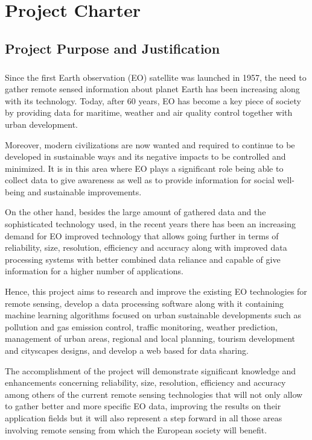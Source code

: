 \chapter{Project Charter}

\section{Project Purpose and Justification}

\paragraph{} 

Since the first Earth observation (EO) satellite was launched in 1957, the need to gather remote sensed information about planet Earth has been increasing along with its technology. Today, after 60 years, EO has become a key piece of society by providing data for maritime, weather and air quality control together with urban development. 

Moreover, modern civilizations are now wanted and required to continue to be developed in sustainable ways and its negative impacts to be controlled and minimized. It is in this area where EO plays a significant role being able to collect data to give awareness as well as to provide information for social well-being and sustainable improvements.

On the other hand, besides the large amount of gathered data and the sophisticated technology used, in the recent years there has been an increasing demand for EO improved technology that allows going further in terms of reliability, size, resolution, efficiency and accuracy along with improved data processing systems with better combined data reliance and capable of give information for a higher number of applications. 


Hence, this project aims to research and improve the existing EO technologies for remote sensing, develop a data processing software along with it containing machine learning algorithms focused on urban sustainable developments such as pollution and gas emission control, traffic monitoring, weather prediction, management of urban areas, regional and local planning, tourism development and cityscapes designs, and develop a web based for data sharing. 


The accomplishment of the project will demonstrate significant knowledge and enhancements concerning reliability, size, resolution, efficiency and accuracy among others of the current remote sensing technologies that will not only allow to gather better and more specific EO data, improving the results on their application fields but it will also represent a step forward in all those areas involving remote sensing from which the European society will benefit. 

